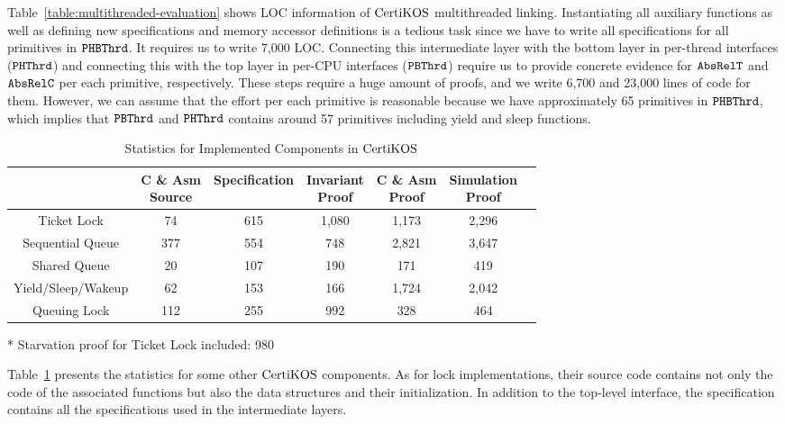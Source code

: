 Table~\ref{table:multithreaded-evaluation} shows LOC information of $\mathrm{CertiKOS}$ multithreaded linking.
Instantiating all auxiliary functions as well as defining new specifications and memory accessor definitions is a tedious task since
we have to write all specifications for all primitives in ${{\mathrm{\texttt{PHBThrd}}}}$. 
It requires us to write  7,000 LOC. 
Connecting this  intermediate layer with the bottom layer in per-thread interfaces (${{\mathrm{\texttt{PHThrd}}}}$) and 
connecting this with the top layer in per-CPU interfaces (${{\mathrm{\texttt{PBThrd}}}}$) require us 
to provide concrete evidence for ${{\mathrm{\texttt{AbsRelT}}}}$ and ${{\mathrm{\texttt{AbsRelC}}}}$ per each primitive, respectively.
These steps require a huge amount of proofs, and we write 6,700  and 23,000 lines of code for them. 
However,  we can assume that the effort per each primitive is reasonable because 
 we have approximately 65 primitives in ${{\mathrm{\texttt{PHBThrd}}}}$, which implies that  ${{\mathrm{\texttt{PBThrd}}}}$ and ${{\mathrm{\texttt{PHThrd}}}}$ contains around 57 primitives including yield and sleep functions.

\begin{table}
\begin{center}
\renewcommand{\arraystretch}{1.1}
\setlength{\tabcolsep}{0.3em}
\begin{tabular}{|c|c|c|c|c|c|c|}
\hline
 & \makecell{ C \& Asm \\Source} & Specification & \makecell{Invariant \\ Proof} & \makecell{C \& Asm \\Proof} & \makecell{Simulation \\ Proof} \\
\hline
Ticket Lock & 74 & 615 & 1,080 & 1,173 & 2,296 \\
\hline
Sequential Queue & 377 & 554 & 748 & 2,821& 3,647 \\
\hline
Shared Queue &  20 & 107 & 190 & 171& 419\\
\hline
Yield/Sleep/Wakeup & 62 & 153 & 166 & 1,724 & 2,042 \\
\hline
Queuing Lock & 112 & 255 & 992 & 328 & 464\\
\hline
\end{tabular}
\newline
\end{center}
\begin{flushright}
* Starvation proof for Ticket Lock included: 980\\
\end{flushright}
\caption{Statistics for Implemented Components in $\mathrm{CertiKOS}$}
\label{table:certikos-evaluation}
\hrulefill
\end{table}
Table~\ref{table:certikos-evaluation} presents  the statistics for some other  $\mathrm{CertiKOS}$ components.
 As for lock implementations, their source code contains not only the code of the associated functions but also the data structures and their initialization. In addition to the top-level interface, the specification contains all the specifications used in the intermediate layers.

